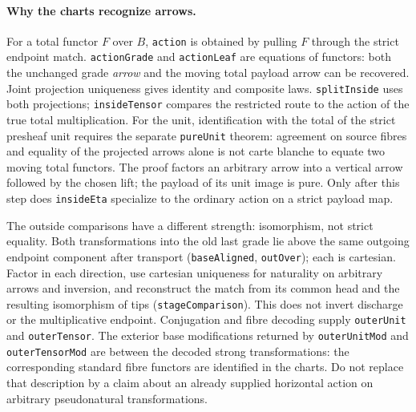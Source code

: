 \documentclass[11pt]{article}
\begin{document}
\paragraph{Why the charts recognize arrows.}
For a total functor $F$ over $B$, \texttt{action} is obtained by pulling $F$
through the strict endpoint match. \texttt{actionGrade} and \texttt{actionLeaf}
are equations of functors: both the unchanged grade \emph{arrow} and the
moving total payload arrow can be recovered. Joint projection uniqueness gives
identity and composite laws. \texttt{splitInside} uses both projections;
\texttt{insideTensor} compares the restricted route to the action of the true
total multiplication. For the unit, identification with the total of the
strict presheaf unit requires the separate \texttt{pureUnit} theorem: agreement
on source fibres and equality of the projected arrows alone is not carte
blanche to equate two moving total functors. The proof factors an arbitrary
arrow into a vertical arrow followed by the chosen lift; the payload of its
unit image is pure. Only after this step does \texttt{insideEta} specialize to
the ordinary action on a strict payload map.
\par The outside comparisons have a different strength: isomorphism, not
strict equality. Both transformations into the old last grade lie above the
same outgoing endpoint component after transport (\texttt{baseAligned},
\texttt{outOver}); each is cartesian. Factor in each direction, use cartesian
uniqueness for naturality on arbitrary arrows and inversion, and reconstruct
the match from its common head and the resulting isomorphism of tips
(\texttt{stageComparison}). This does not invert discharge or the multiplicative
endpoint. Conjugation and fibre decoding supply \texttt{outerUnit} and
\texttt{outerTensor}. The exterior base modifications returned by
\texttt{outerUnitMod} and \texttt{outerTensorMod} are between the decoded
strong transformations: the corresponding standard fibre functors are
identified in the charts. Do not replace that description by a claim about an
already supplied horizontal action on arbitrary pseudonatural transformations.
\end{document}

